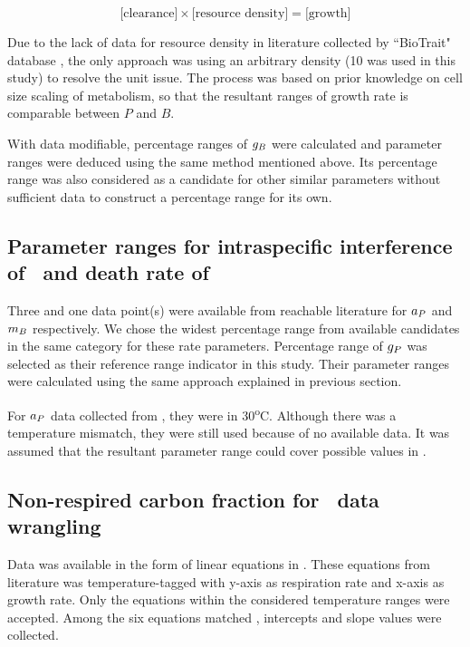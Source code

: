 \documentclass[../thesis.tex]{subfiles} %
\begin{document}
\begin{equation}
    \text{[clearance]} \times \text{[resource density]} = \text{[growth]}
    \label{eq:gB}
\end{equation}

Due to the lack of data for resource density in literature collected by ``BioTrait" database \autocite{della2013thermal}, the only approach was using an arbitrary density (10 was used in this study) to resolve the unit issue.  The process was based on prior knowledge on cell size scaling of metabolism, so that the resultant ranges of growth rate is comparable between $P$ and $B$.

With data modifiable, percentage ranges of $g_B$ were calculated and parameter ranges were deduced using the same method mentioned above.  Its percentage range was also considered as a candidate for other similar parameters without sufficient data to construct a percentage range for its own.

\subsection{Parameter ranges for intraspecific interference of \phy\ and death rate of \bac}
Three and one data point(s) were available from reachable literature for $a_P$ \autocite{de2007biofixation} and $m_B$ \autocite{cochran1988estimation} respectively.  We chose the widest percentage range from available candidates in the same category for these rate parameters.  Percentage range of $g_P$ was selected as their reference range indicator in this study.  Their parameter ranges were calculated using the same approach explained in previous section.

For $a_P$ data collected from \autocite{de2007biofixation}, they were in 30\textsuperscript{o}C.  Although there was a temperature mismatch, they were still used because of no available data.  It was assumed that the resultant parameter range could cover possible values in \temp.

\subsection{Non-respired carbon fraction for \phy\ data wrangling}
Data was available in the form of linear equations in \autocite{j1989respiration}.  These equations from literature was temperature-tagged with y-axis as respiration rate and x-axis as growth rate.  Only the equations within the considered temperature ranges were accepted.  Among the six equations matched , intercepts and slope values were collected.
\end{document}
